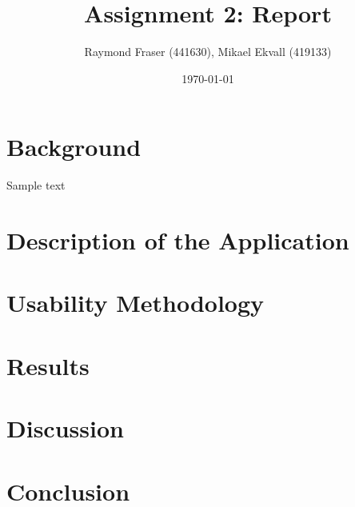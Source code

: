 \documentclass[10pt,a4paper]{extarticle}
\begin{document}
\title{Assignment 2: Report}
\author{Raymond Fraser (441630), Mikael Ekvall (419133)}
\date{\today}
\maketitle
\newpage

\section{Background}
Sample \cite{bryant_2007} text \cite{hyoun_2017}
\section{Description of the Application}
\section{Usability Methodology}
\section{Results}
\section{Discussion}
\section{Conclusion}

\newpage
\printbibliography[title={Bibliography}]
\end{document}
